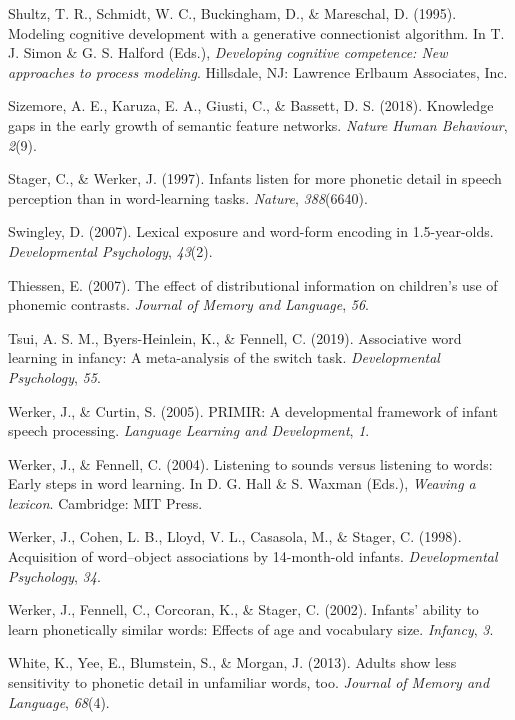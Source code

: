 \documentclass[english,,man,floatsintext]{apa6}
\theoremstyle{definition}
\theoremstyle{definition}
\theoremstyle{definition}
\theoremstyle{remark}
\begin{document}
\hypertarget{ref-shultz1995}{}
Shultz, T. R., Schmidt, W. C., Buckingham, D., \& Mareschal, D. (1995).
Modeling cognitive development with a generative connectionist
algorithm. In T. J. Simon \& G. S. Halford (Eds.), \emph{Developing
cognitive competence: New approaches to process modeling}. Hillsdale,
NJ: Lawrence Erlbaum Associates, Inc.

\hypertarget{ref-sizemore2018}{}
Sizemore, A. E., Karuza, E. A., Giusti, C., \& Bassett, D. S. (2018).
Knowledge gaps in the early growth of semantic feature networks.
\emph{Nature Human Behaviour}, \emph{2}(9).

\hypertarget{ref-stager1997}{}
Stager, C., \& Werker, J. (1997). Infants listen for more phonetic
detail in speech perception than in word-learning tasks. \emph{Nature},
\emph{388}(6640).

\hypertarget{ref-swingley2007}{}
Swingley, D. (2007). Lexical exposure and word-form encoding in
1.5-year-olds. \emph{Developmental Psychology}, \emph{43}(2).

\hypertarget{ref-thiessen2007}{}
Thiessen, E. (2007). The effect of distributional information on
children's use of phonemic contrasts. \emph{Journal of Memory and
Language}, \emph{56}.

\hypertarget{ref-tsui2019}{}
Tsui, A. S. M., Byers-Heinlein, K., \& Fennell, C. (2019). Associative
word learning in infancy: A meta-analysis of the switch task.
\emph{Developmental Psychology}, \emph{55}.

\hypertarget{ref-werker2005}{}
Werker, J., \& Curtin, S. (2005). PRIMIR: A developmental framework of
infant speech processing. \emph{Language Learning and Development},
\emph{1}.

\hypertarget{ref-werker2004}{}
Werker, J., \& Fennell, C. (2004). Listening to sounds versus listening
to words: Early steps in word learning. In D. G. Hall \& S. Waxman
(Eds.), \emph{Weaving a lexicon}. Cambridge: MIT Press.

\hypertarget{ref-werker1998}{}
Werker, J., Cohen, L. B., Lloyd, V. L., Casasola, M., \& Stager, C.
(1998). Acquisition of word--object associations by 14-month-old
infants. \emph{Developmental Psychology}, \emph{34}.

\hypertarget{ref-werker2002}{}
Werker, J., Fennell, C., Corcoran, K., \& Stager, C. (2002). Infants'
ability to learn phonetically similar words: Effects of age and
vocabulary size. \emph{Infancy}, \emph{3}.

\hypertarget{ref-white2013}{}
White, K., Yee, E., Blumstein, S., \& Morgan, J. (2013). Adults show
less sensitivity to phonetic detail in unfamiliar words, too.
\emph{Journal of Memory and Language}, \emph{68}(4).
\end{document}
